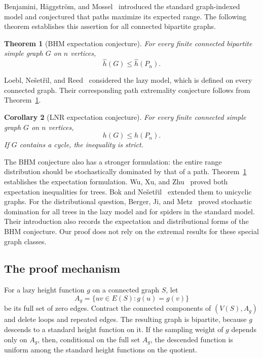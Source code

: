 \documentclass[11pt,reqno]{amsart}
\newtheorem{theorem}{Theorem}[section]
\newtheorem{corollary}[theorem]{Corollary}
\theoremstyle{remark}
\numberwithin{equation}{section}
\begin{document}
Benjamini, H\"aggstr\"om, and Mossel~\cite{BHM} introduced the standard
graph-indexed model and conjectured that paths maximize its expected range.
The following theorem establishes this assertion for all connected bipartite graphs.

\begin{theorem}[BHM expectation conjecture]\label{thm:bhm}
For every finite connected bipartite simple graph $G$ on $n$ vertices,
\begin{equation}\label{eq:bhm}
 \widehat h(G)\le\widehat h(P_n).
\end{equation}
\end{theorem}

Loebl, Ne\v set\v ril, and Reed~\cite{LNR} considered the lazy model,
which is defined on every connected graph. Their corresponding path
extremality conjecture follows from Theorem~\ref{thm:bhm}.

\begin{corollary}[LNR expectation conjecture]\label{cor:lnr}
For every finite connected simple graph $G$ on $n$ vertices,
\begin{equation}\label{eq:lnr}
 h(G)\le h(P_n).
\end{equation}
If $G$ contains a cycle, the inequality is strict.
\end{corollary}

The BHM conjecture also has a stronger formulation: the entire range
distribution should be stochastically dominated by that of a path.
Theorem~\ref{thm:bhm} establishes the expectation formulation.
Wu, Xu, and Zhu~\cite{WXZ} proved both expectation inequalities for trees.
Bok and Ne\v set\v ril~\cite{BN} extended them to unicyclic graphs.
For the distributional question, Berger, Ji, and Metz~\cite{BJM} proved
stochastic domination for all trees in the lazy model and for spiders
in the standard model. Their introduction also records the expectation
and distributional forms of the BHM conjecture. Our proof does not rely
on the extremal results for these special graph classes.

\subsection*{The proof mechanism}
For a lazy height function $g$ on a connected graph $S$, let
\[
 A_g=\{uv\in E(S):g(u)=g(v)\}
\]
be its full set of zero edges. Contract the connected components of
$(V(S),A_g)$ and delete loops and repeated edges. The resulting graph is
bipartite, because $g$ descends to a standard height function on it.
If the sampling weight of $g$ depends only on $A_g$, then, conditional
on the full set $A_g$, the descended function is uniform among the
standard height functions on the quotient.
\end{document}
